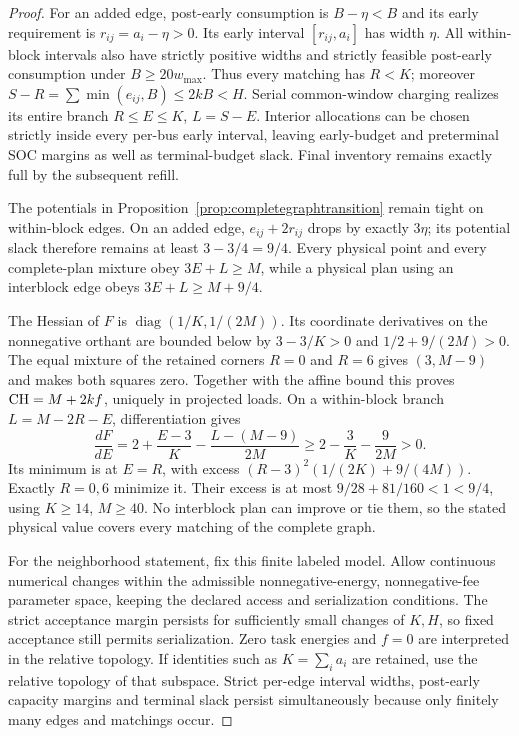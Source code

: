 \begin{proof}
For an added edge, post-early consumption is $B-\eta<B$ and its early
requirement is $r_{ij}=a_i-\eta>0$. Its early interval
$[r_{ij},a_i]$ has width $\eta$. All within-block intervals also have
strictly positive widths and strictly feasible post-early consumption
under $B\ge20w_{\max}$. Thus every matching has $R<K$; moreover
$S-R=\sum\min(e_{ij},B)\le2kB<H$. Serial common-window charging
realizes its entire branch $R\le E\le K$, $L=S-E$. Interior allocations
can be chosen strictly inside every per-bus early interval, leaving
early-budget and preterminal SOC margins as well as terminal-budget
slack. Final inventory remains exactly full by the subsequent refill.

The potentials in Proposition~\ref{prop:completegraphtransition} remain
tight on within-block edges. On an added edge, $e_{ij}+2r_{ij}$ drops by
exactly $3\eta$; its potential slack therefore remains at least
$3-3/4=9/4$. Every physical point and every complete-plan mixture obey
$3E+L\ge M$, while a physical plan using an interblock edge obeys
$3E+L\ge M+9/4$.

The Hessian of $F$ is $\operatorname{diag}(1/K,1/(2M))$. Its coordinate
derivatives on the nonnegative orthant are bounded below by
$3-3/K>0$ and $1/2+9/(2M)>0$. The equal mixture of the retained
corners $R=0$ and $R=6$ gives $(3,M-9)$ and makes both squares zero. Together with
the affine bound this proves $\mathrm{CH}=M+2kf$, uniquely in projected loads.
On a within-block branch $L=M-2R-E$, differentiation gives
\[
 \frac{dF}{dE}
 =2+\frac{E-3}{K}-\frac{L-(M-9)}{2M}
 \ge2-\frac3K-\frac9{2M}>0.
\]
Its minimum is at $E=R$, with excess
$(R-3)^2(1/(2K)+9/(4M))$. Exactly $R=0,6$ minimize it. Their excess is
at most $9/28+81/160<1<9/4$, using $K\ge14$, $M\ge40$.
No interblock plan can improve or tie them, so the stated physical
value covers every matching of the complete graph.

For the neighborhood statement, fix this finite labeled model. Allow
continuous numerical changes within the admissible nonnegative-energy,
nonnegative-fee parameter space, keeping the declared access and
serialization conditions. The strict acceptance margin persists for
sufficiently small changes of $K,H$, so fixed acceptance still permits
serialization. Zero task energies and $f=0$ are interpreted
in the relative topology. If identities such as $K=\sum_i a_i$ are
retained, use the relative topology of that subspace. Strict per-edge
interval widths, post-early capacity margins and terminal slack persist
simultaneously because only finitely many edges and matchings occur.


\end{proof}
